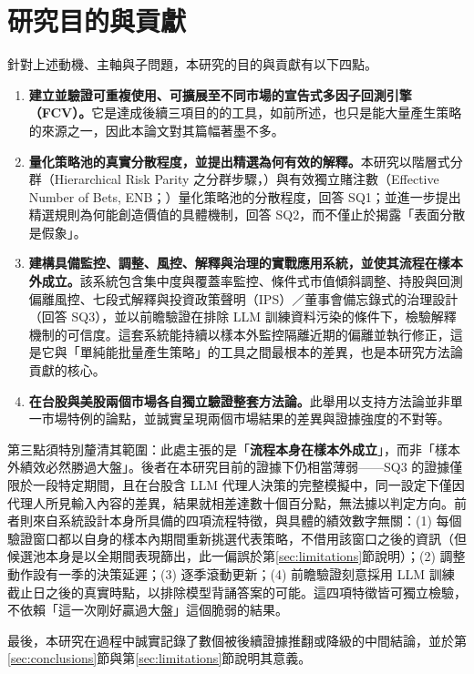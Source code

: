 \section{研究目的與貢獻}\label{sec:contribution}

針對上述動機、主軸與子問題，本研究的目的與貢獻有以下四點。

\begin{enumerate}
  \item \textbf{建立並驗證可重複使用、可擴展至不同市場的宣告式多因子回測引擎（FCV）。}它是達成後續三項目的的工具，如前所述，也只是能大量產生策略的來源之一，因此本論文對其篇幅著墨不多。
  \item \textbf{量化策略池的真實分散程度，並提出精選為何有效的解釋。}本研究以階層式分群（Hierarchical Risk Parity 之分群步驟，\textcite{lopezdeprado2016hrp}）與有效獨立賭注數（Effective Number of Bets, ENB；\textcite{meucci2009}）量化策略池的分散程度，回答 SQ1；並進一步提出精選規則為何能創造價值的具體機制，回答 SQ2，而不僅止於揭露「表面分散是假象」。
  \item \textbf{建構具備監控、調整、風控、解釋與治理的實戰應用系統，並使其流程在樣本外成立。}該系統包含集中度與覆蓋率監控、條件式市值傾斜調整、持股與回測偏離風控、七段式解釋與投資政策聲明（IPS）／董事會備忘錄式的治理設計（回答 SQ3），並以前瞻驗證在排除 LLM 訓練資料污染的條件下，檢驗解釋機制的可信度。這套系統能持續以樣本外監控隔離近期的偏離並執行修正，這是它與「單純能批量產生策略」的工具之間最根本的差異，也是本研究方法論貢獻的核心。
  \item \textbf{在台股與美股兩個市場各自獨立驗證整套方法論。}此舉用以支持方法論並非單一市場特例的論點，並誠實呈現兩個市場結果的差異與證據強度的不對等。
\end{enumerate}

第三點須特別釐清其範圍：此處主張的是「\textbf{流程本身在樣本外成立}」，而非「樣本外績效必然勝過大盤」。後者在本研究目前的證據下仍相當薄弱——SQ3 的證據僅限於一段特定期間，且在台股含 LLM 代理人決策的完整模擬中，同一設定下僅因代理人所見輸入內容的差異，結果就相差達數十個百分點，無法據以判定方向。前者則來自系統設計本身所具備的四項流程特徵，與具體的績效數字無關：(1) 每個驗證窗口都以自身的樣本內期間重新挑選代表策略，不借用該窗口之後的資訊（但候選池本身是以全期間表現篩出，此一偏誤於第\ref{sec:limitations}節說明）；(2) 調整動作設有一季的決策延遲；(3) 逐季滾動更新；(4) 前瞻驗證刻意採用 LLM 訓練截止日之後的真實時點，以排除模型背誦答案的可能。這四項特徵皆可獨立檢驗，不依賴「這一次剛好贏過大盤」這個脆弱的結果。

最後，本研究在過程中誠實記錄了數個被後續證據推翻或降級的中間結論，並於第\ref{sec:conclusions}節與第\ref{sec:limitations}節說明其意義。


